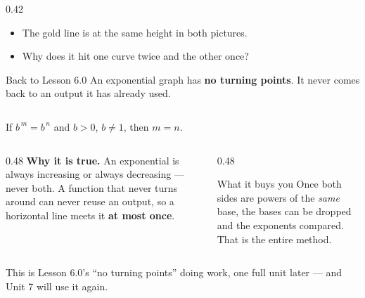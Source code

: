 \documentclass[aspectratio=169, 11pt]{beamer}
\begin{document}
\begin{frame}[t, plain]
\begin{columns}[T]
\begin{column}{0.42\textwidth}
\begin{itemize}
        \item The gold line is at the same height in both pictures.
        \item Why does it hit one curve twice and the other once?
      \end{itemize}
      \vspace{3pt}
      \begin{block}{Back to Lesson 6.0}
        An exponential graph has \textbf{no turning points}. It never comes back to an output it has
        already used.
      \end{block}
    \end{column}
  \end{columns}
\end{frame}

\begin{frame}[t, plain]
  \begin{center}
    \Large If \; $b^{\,m}=b^{\,n}$ \; and \; $b>0$, $b\neq1$, \qquad then \; $m=n$.
  \end{center}
  \vspace{10pt}
  \begin{columns}[T]
    \begin{column}{0.48\textwidth}
      \footnotesize
      \textbf{Why it is true.} An exponential is always increasing or always decreasing --- never both.
      A function that never turns around can never reuse an output, so a horizontal line meets it
      \textbf{at most once}.
    \end{column}
    \begin{column}{0.48\textwidth}
      \begin{block}{What it buys you}
        Once both sides are powers of the \emph{same} base, the bases can be dropped and the exponents
        compared. That is the entire method.
      \end{block}
    \end{column}
  \end{columns}
  \vspace{8pt}
  \begin{center}
    {\footnotesize This is Lesson 6.0's ``no turning points'' doing work, one full unit later --- and
    Unit 7 will use it again.}
  \end{center}
\end{frame}
\end{document}
